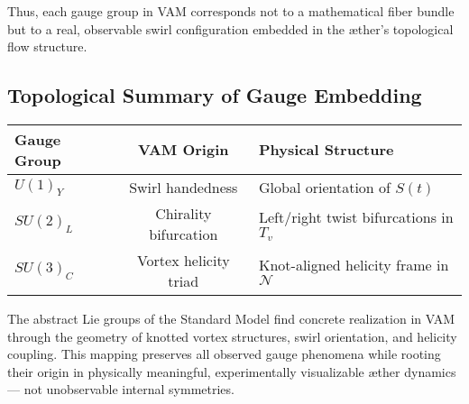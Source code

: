 Thus, each gauge group in VAM corresponds not to a mathematical fiber bundle but to a real, observable swirl configuration embedded in the æther’s topological flow structure.

\subsection{Topological Summary of Gauge Embedding}

\begin{center}
\begin{tabular}{|l|c|l|}
\hline
\textbf{Gauge Group} & \textbf{VAM Origin} & \textbf{Physical Structure} \\
\hline
$U(1)_Y$ & Swirl handedness & Global orientation of $S(t)$ \\
$SU(2)_L$ & Chirality bifurcation & Left/right twist bifurcations in $T_v$ \\
$SU(3)_C$ & Vortex helicity triad & Knot-aligned helicity frame in $\mathcal{N}$ \\
\hline
\end{tabular}
\end{center}

The abstract Lie groups of the Standard Model find concrete realization in VAM through the geometry of knotted vortex structures, swirl orientation, and helicity coupling. This mapping preserves all observed gauge phenomena while rooting their origin in physically meaningful, experimentally visualizable æther dynamics — not unobservable internal symmetries.


